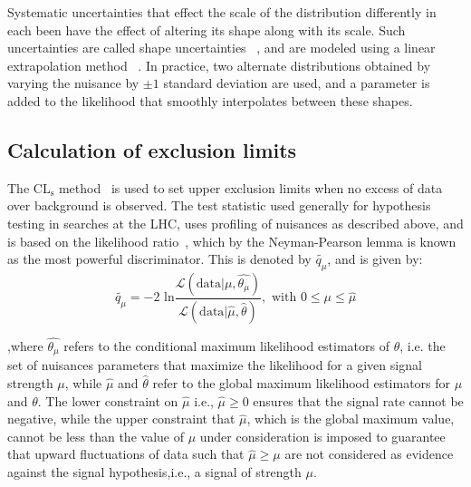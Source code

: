 Systematic uncertainties that effect the scale of the distribution differently in each been have the effect of altering its shape along with its scale. Such uncertainties are called shape uncertainties ~\cite{shape_syst1}, and are modeled using a linear extrapolation method ~\cite{shape_syst2}. In practice, two alternate distributions obtained by varying the nuisance by $\pm 1$ standard deviation are used, and a parameter is added to the likelihood that smoothly interpolates between these shapes.

\subsection{Calculation of exclusion limits}
\label{exc_cal}
The CL$_\text{s}$ method~\cite{cls1,cls2,cls3} is used to set upper exclusion limits when no excess of data over background is observed. The test statistic used generally for hypothesis testing in searches at the LHC, uses profiling of nuisances as described above, and is based on the likelihood ratio~\cite{prof_likelihood}, which by the Neyman-Pearson lemma is known as the most powerful discriminator. This is denoted by $\tilde{q_\mu}$, and is given by:
\begin{equation}
\label{eq:proflik}
  \tilde{q_\mu}=-2\text{ ln}\frac{\mathcal{L}(\text{data}|\mu,\hat{\theta_\mu})}{\mathcal{L}(\text{data}|\hat{\mu},\hat{\theta})},\text{   with  } 0\leq \mu \leq \hat{\mu} 
\end{equation}

,where $\hat{\theta_\mu}$ refers to the conditional maximum likelihood estimators of $\theta$, i.e. the set of nuisances parameters that maximize the likelihood for a given signal strength $\mu$, while $\hat\mu$ and $\hat\theta$ refer to the global maximum likelihood estimators for $\mu$ and $\theta$. The lower constraint on $\hat{\mu}$ i.e., $\hat{\mu}\geq 0$ ensures that the signal rate cannot be negative, while the upper constraint that $\hat{\mu}$, which is the global maximum value, cannot be less than the value of $\mu$ under consideration is imposed to guarantee that upward fluctuations of data such that $\hat{\mu}\geq \mu$ are not considered as evidence against the signal hypothesis,i.e., a signal of strength $\mu$.

